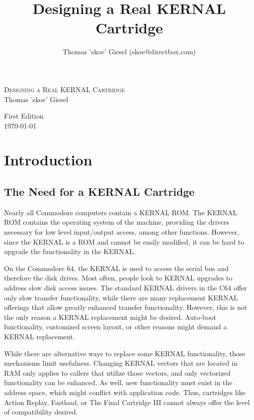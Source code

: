 \documentclass[a4paper,oneside]{memoir}
\title{Designing a Real KERNAL Cartridge}
\author{
Thomas 'skoe' Giesel
(skoe@directbox.com)
}
\begin{document}
\hsize

\pagestyle{empty}
\begin{center}

\vspace*{5cm}
\textsc{\huge Designing a Real KERNAL Cartridge}\\[2cm]
{\large Thomas 'skoe' Giesel}

\vfill

{\large First Edition \\[0.5cm] \today}

\end{center}

\clearpage

\tableofcontents

\chapter{Introduction}

\section{The Need for a KERNAL Cartridge}

Nearly all Commodore computers contain a KERNAL ROM. The KERNAL ROM
contains the operating system of the machine, providing the drivers
necessary for low level input/output access, among other functions.
However, since the KERNAL is a ROM and cannot be easily modified, it
can be hard to upgrade the functionality in the KERNAL.

On the Commodore 64, the KERNAL is used to access the serial bus and
therefore the disk drives. Most often, people look to KERNAL
upgrades to address slow disk access issues. The standard KERNAL
drivers in the C64 offer only slow transfer functionality, while
there are many replacement KERNAL offerings that allow greatly
enhanced transfer functionality. However, this is not the only
reason a KERNAL replacement might be desired. Auto-boot
functionality, customized screen layout, or other reasons might
demand a KERNAL replacement.

While there are alternative ways to
replace some KERNAL functionality, those mechanisms limit
usefulness. Changing KERNAL vectors that are located in RAM only
applies to callers that utilize those vectors, and only vectorized
functionality can be enhanced. As well, new functionality must
exist in the address space, which might conflict with application
code. Thus, cartridges like Action Replay, Fastload, or The Final
Cartridge III cannot always offer the level of compatibility
desired.
\end{document}
